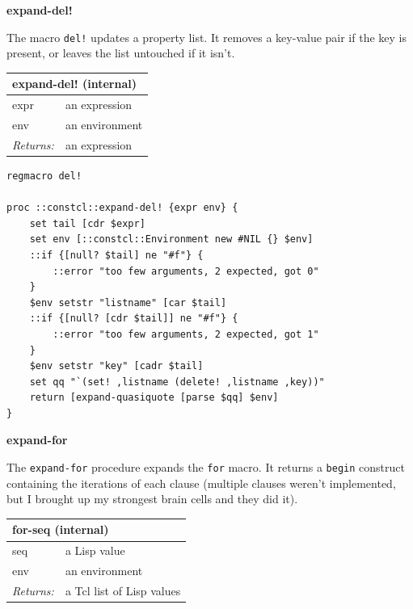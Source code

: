 \documentclass[twoside,9pt]{report}
\begin{document}
\textbf{expand-del!}


The macro \texttt{del!} updates a property list. It removes a key-value pair if the key is present, or leaves the list untouched if it isn't.

\begin{tabular}{ |l l| }
\hline
\multicolumn{2}{|l|}{expand-del! (internal)} \\
\hline
expr & an expression \\
env & an environment \\
\textit{Returns:} & an expression \\
\hline
\end{tabular}

\noindent\makebox[\linewidth]{\rule{\linewidth}{0.4pt}}
\begin{lstlisting}
regmacro del!
 
proc ::constcl::expand-del! {expr env} {
    set tail [cdr $expr]
    set env [::constcl::Environment new #NIL {} $env]
    ::if {[null? $tail] ne "#f"} {
        ::error "too few arguments, 2 expected, got 0"
    }
    $env setstr "listname" [car $tail]
    ::if {[null? [cdr $tail]] ne "#f"} {
        ::error "too few arguments, 2 expected, got 1"
    }
    $env setstr "key" [cadr $tail]
    set qq "`(set! ,listname (delete! ,listname ,key))"
    return [expand-quasiquote [parse $qq] $env]
}
\end{lstlisting}
\noindent\makebox[\linewidth]{\rule{\linewidth}{0.4pt}}

\textbf{expand-for}


The \texttt{expand-for} procedure expands the \texttt{for} macro. It returns a \texttt{begin} construct containing the iterations of each clause (multiple clauses weren't implemented, but I brought up my strongest brain cells and they did it).

\begin{tabular}{ |l l| }
\hline
\multicolumn{2}{|l|}{for-seq (internal)} \\
\hline
seq & a Lisp value \\
env & an environment \\
\textit{Returns:} & a Tcl list of Lisp values \\
\hline
\end{tabular}
\end{document}
